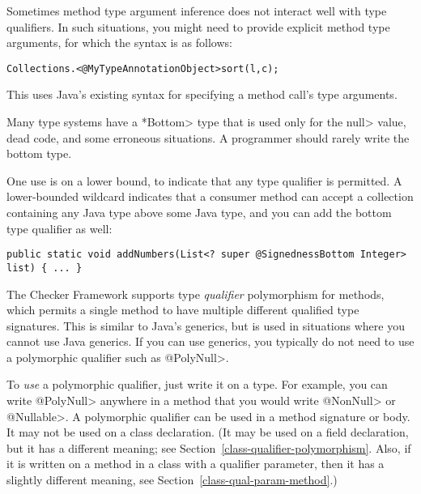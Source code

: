 
Sometimes method type argument inference does not interact well with
type qualifiers. In such situations, you might need to provide
explicit method type arguments, for which the syntax is as follows:

\begin{alltt}
    Collections.<@MyTypeAnnotation Object>sort(l, c);
\end{alltt}

\noindent
This uses Java's existing syntax for specifying a method call's type arguments.



Many type systems have a \<*Bottom> type that is used only for the \<null>
value, dead code, and some erroneous situations.  A programmer should
rarely write the bottom type.

One use is on a lower bound, to indicate that any type qualifier is
permitted.  A lower-bounded wildcard indicates that a consumer method can
accept a collection containing any Java type above some Java type, and you
can add the bottom type qualifier as well:

\begin{Verbatim}
public static void addNumbers(List<? super @SignednessBottom Integer> list) { ... }
\end{Verbatim}



The Checker Framework supports type \emph{qualifier} polymorphism for
methods, which permits a single method to have multiple different qualified
type signatures.  This is similar to Java's generics, but is used in
situations where you cannot use Java generics.  If you can use generics,
you typically do not need to use a polymorphic qualifier such as \<@PolyNull>.

To \emph{use} a polymorphic qualifier, just write it on a type.
For example, you can write \<@PolyNull> anywhere in a method that you would write
\<@NonNull> or \<@Nullable>.
A polymorphic qualifier can be used in a method signature or body.
It may not be used on a class declaration.
(It may be used on a field declaration, but it has a different meaning;
see Section~\ref{class-qualifier-polymorphism}. Also, if it is written on a method in a class with
a qualifier parameter, then it has a slightly different meaning, see Section~\ref{class-qual-param-method}.)

